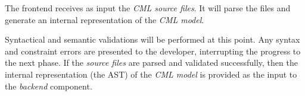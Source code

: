 The frontend receives as input the \emph{CML source files}.
It will parse the files and generate an internal representation of the \emph{CML model}.

Syntactical and semantic validations will be performed at this point.
Any syntax and constraint errors are presented to the developer, interrupting the progress to the next phase.
If the \emph{source files} are parsed and validated successfully, then the internal representation (the AST) of the \emph{CML model} is provided as the input to the \emph{backend} component.
